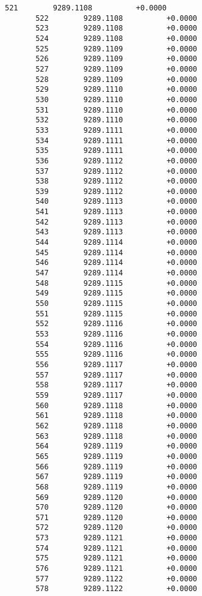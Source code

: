 \documentclass[11pt]{article}
\begin{document}
\begin{Verbatim}[commandchars=\\\{\}]
       521        9289.1108          +0.0000
       522        9289.1108          +0.0000
       523        9289.1108          +0.0000
       524        9289.1108          +0.0000
       525        9289.1109          +0.0000
       526        9289.1109          +0.0000
       527        9289.1109          +0.0000
       528        9289.1109          +0.0000
       529        9289.1110          +0.0000
       530        9289.1110          +0.0000
       531        9289.1110          +0.0000
       532        9289.1110          +0.0000
       533        9289.1111          +0.0000
       534        9289.1111          +0.0000
       535        9289.1111          +0.0000
       536        9289.1112          +0.0000
       537        9289.1112          +0.0000
       538        9289.1112          +0.0000
       539        9289.1112          +0.0000
       540        9289.1113          +0.0000
       541        9289.1113          +0.0000
       542        9289.1113          +0.0000
       543        9289.1113          +0.0000
       544        9289.1114          +0.0000
       545        9289.1114          +0.0000
       546        9289.1114          +0.0000
       547        9289.1114          +0.0000
       548        9289.1115          +0.0000
       549        9289.1115          +0.0000
       550        9289.1115          +0.0000
       551        9289.1115          +0.0000
       552        9289.1116          +0.0000
       553        9289.1116          +0.0000
       554        9289.1116          +0.0000
       555        9289.1116          +0.0000
       556        9289.1117          +0.0000
       557        9289.1117          +0.0000
       558        9289.1117          +0.0000
       559        9289.1117          +0.0000
       560        9289.1118          +0.0000
       561        9289.1118          +0.0000
       562        9289.1118          +0.0000
       563        9289.1118          +0.0000
       564        9289.1119          +0.0000
       565        9289.1119          +0.0000
       566        9289.1119          +0.0000
       567        9289.1119          +0.0000
       568        9289.1119          +0.0000
       569        9289.1120          +0.0000
       570        9289.1120          +0.0000
       571        9289.1120          +0.0000
       572        9289.1120          +0.0000
       573        9289.1121          +0.0000
       574        9289.1121          +0.0000
       575        9289.1121          +0.0000
       576        9289.1121          +0.0000
       577        9289.1122          +0.0000
       578        9289.1122          +0.0000

\end{Verbatim}
\end{document}
